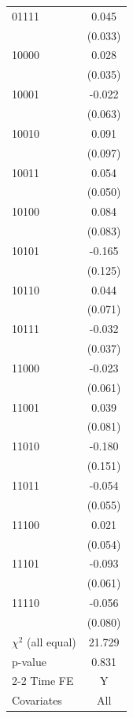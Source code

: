 \begin{tabular}{l c}
01111               &       0.045         \\
                    &     (0.033)         \\
10000               &       0.028         \\
                    &     (0.035)         \\
10001               &      -0.022         \\
                    &     (0.063)         \\
10010               &       0.091         \\
                    &     (0.097)         \\
10011               &       0.054         \\
                    &     (0.050)         \\
10100               &       0.084         \\
                    &     (0.083)         \\
10101               &      -0.165         \\
                    &     (0.125)         \\
10110               &       0.044         \\
                    &     (0.071)         \\
10111               &      -0.032         \\
                    &     (0.037)         \\
11000               &      -0.023         \\
                    &     (0.061)         \\
11001               &       0.039         \\
                    &     (0.081)         \\
11010               &      -0.180         \\
                    &     (0.151)         \\
11011               &      -0.054         \\
                    &     (0.055)         \\
11100               &       0.021         \\
                    &     (0.054)         \\
11101               &      -0.093         \\
                    &     (0.061)         \\
11110               &      -0.056         \\
                    &     (0.080)         \\
\addlinespace
$\chi^2$ (all equal)&      21.729         \\
p-value             &       0.831         \\
\cmidrule{2-2} Time FE & Y \\ Covariates & All \\ \bottomrule \end{tabular}
